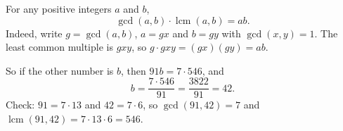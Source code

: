For any positive integers $a$ and $b$,
\[
\gcd(a,b)\cdot\operatorname{lcm}(a,b)=ab .
\]
Indeed, write $g=\gcd(a,b)$, $a=gx$ and $b=gy$ with $\gcd(x,y)=1$. The least common multiple is $gxy$, so $g\cdot gxy=(gx)(gy)=ab$.

So if the other number is $b$, then $91b=7\cdot546$, and
\[
b=\dfrac{7\cdot546}{91}=\dfrac{3822}{91}=\boxed{42}.
\]
Check: $91=7\cdot13$ and $42=7\cdot6$, so $\gcd(91,42)=7$ and $\operatorname{lcm}(91,42)=7\cdot13\cdot6=546$.
